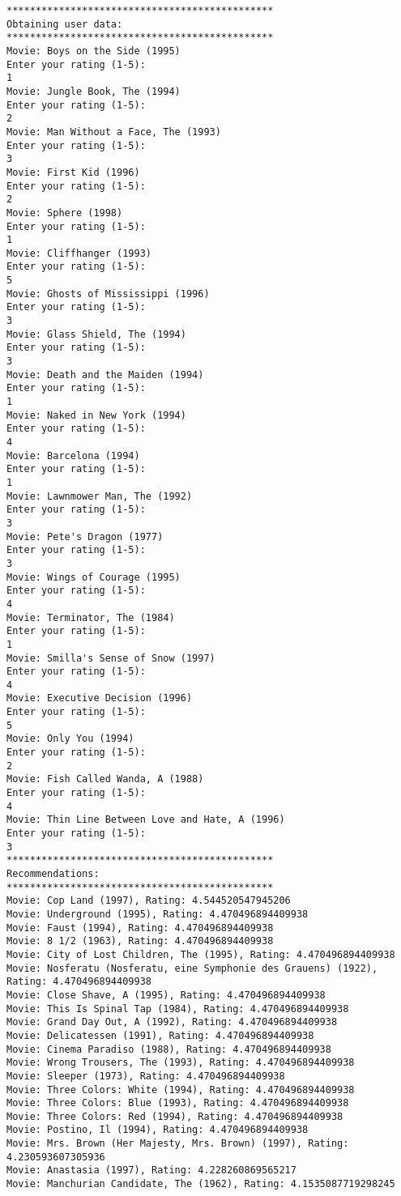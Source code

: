 \begin{lstlisting}
**********************************************
Obtaining user data: 
**********************************************
Movie: Boys on the Side (1995)
Enter your rating (1-5):
1
Movie: Jungle Book, The (1994)
Enter your rating (1-5):
2
Movie: Man Without a Face, The (1993)
Enter your rating (1-5):
3
Movie: First Kid (1996)
Enter your rating (1-5):
2
Movie: Sphere (1998)
Enter your rating (1-5):
1
Movie: Cliffhanger (1993)
Enter your rating (1-5):
5
Movie: Ghosts of Mississippi (1996)
Enter your rating (1-5):
3
Movie: Glass Shield, The (1994)
Enter your rating (1-5):
3
Movie: Death and the Maiden (1994)
Enter your rating (1-5):
1
Movie: Naked in New York (1994)
Enter your rating (1-5):
4
Movie: Barcelona (1994)
Enter your rating (1-5):
1
Movie: Lawnmower Man, The (1992)
Enter your rating (1-5):
3
Movie: Pete's Dragon (1977)
Enter your rating (1-5):
3
Movie: Wings of Courage (1995)
Enter your rating (1-5):
4
Movie: Terminator, The (1984)
Enter your rating (1-5):
1
Movie: Smilla's Sense of Snow (1997)
Enter your rating (1-5):
4
Movie: Executive Decision (1996)
Enter your rating (1-5):
5
Movie: Only You (1994)
Enter your rating (1-5):
2
Movie: Fish Called Wanda, A (1988)
Enter your rating (1-5):
4
Movie: Thin Line Between Love and Hate, A (1996)
Enter your rating (1-5):
3
**********************************************
Recommendations: 
**********************************************
Movie: Cop Land (1997), Rating: 4.544520547945206
Movie: Underground (1995), Rating: 4.470496894409938
Movie: Faust (1994), Rating: 4.470496894409938
Movie: 8 1/2 (1963), Rating: 4.470496894409938
Movie: City of Lost Children, The (1995), Rating: 4.470496894409938
Movie: Nosferatu (Nosferatu, eine Symphonie des Grauens) (1922), Rating: 4.470496894409938
Movie: Close Shave, A (1995), Rating: 4.470496894409938
Movie: This Is Spinal Tap (1984), Rating: 4.470496894409938
Movie: Grand Day Out, A (1992), Rating: 4.470496894409938
Movie: Delicatessen (1991), Rating: 4.470496894409938
Movie: Cinema Paradiso (1988), Rating: 4.470496894409938
Movie: Wrong Trousers, The (1993), Rating: 4.470496894409938
Movie: Sleeper (1973), Rating: 4.470496894409938
Movie: Three Colors: White (1994), Rating: 4.470496894409938
Movie: Three Colors: Blue (1993), Rating: 4.470496894409938
Movie: Three Colors: Red (1994), Rating: 4.470496894409938
Movie: Postino, Il (1994), Rating: 4.470496894409938
Movie: Mrs. Brown (Her Majesty, Mrs. Brown) (1997), Rating: 4.230593607305936
Movie: Anastasia (1997), Rating: 4.228260869565217
Movie: Manchurian Candidate, The (1962), Rating: 4.1535087719298245
\end{lstlisting}




